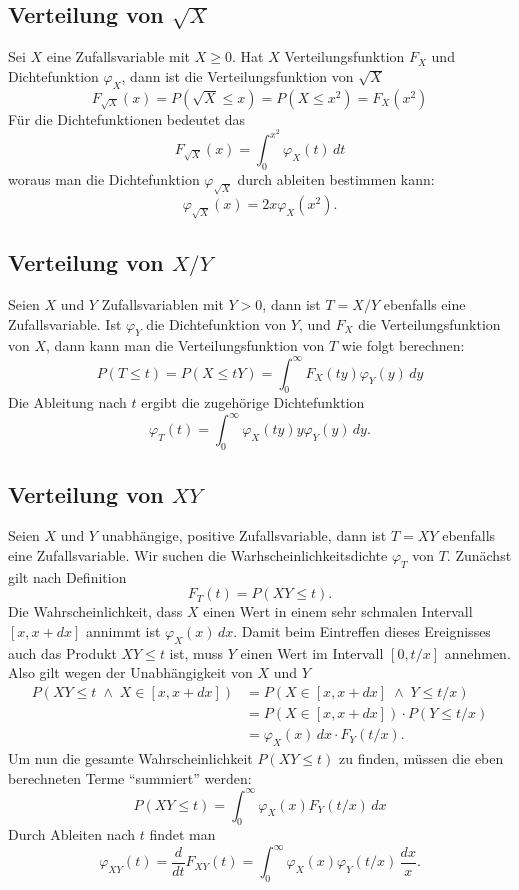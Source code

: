 \subsection{Verteilung von \texorpdfstring{$\sqrt{X}$}{Wurzel X}} \label{verteilungsfunktion-wurzel}
Sei $X$ eine Zufallsvariable mit $X\ge 0$.
Hat $X$ Verteilungsfunktion $F_X$
und Dichtefunktion
$\varphi_X$, dann ist die Verteilungsfunktion von $\sqrt{X}$
\[
F_{\sqrt{X}}(x)=P(\sqrt{X}\le x)=P(X\le x^2)=F_X(x^2)
\]
Für die Dichtefunktionen bedeutet das
\[
F_{\sqrt{X}}(x)=\int_0^{x^2}\varphi_X(t)\,dt
\]
woraus man die Dichtefunktion $\varphi_{\sqrt{X}}$ durch ableiten
bestimmen kann:
\[
\varphi_{\sqrt{X}}(x)=2x\varphi_X(x^2).
\]

\subsection{Verteilung von \texorpdfstring{$X/Y$}{X/Y}} \label{verteilungsfunktion-quotient}
Seien $X$ und $Y$ Zufallsvariablen mit $Y>0$, dann ist $T=X/Y$ ebenfalls
eine Zufallsvariable.
Ist $\varphi_Y$ die Dichtefunktion von $Y$,
und $F_X$ die Verteilungsfunktion von $X$, dann kann man die
Verteilungsfunktion von $T$ wie folgt berechnen:
\[
P(T\le t)=P(X\le tY)=\int_0^\infty F_X(ty)\varphi_Y(y)\,dy
\]
Die Ableitung nach $t$ ergibt die zugehörige Dichtefunktion
\[
\varphi_T(t)=\int_0^\infty\varphi_X(ty)y\varphi_Y(y)\,dy.
\]

\subsection{Verteilung von \texorpdfstring{$XY$}{XY}} \label{verteilungsfunktion-produkt}
Seien $X$ und $Y$ unabhängige, positive Zufallsvariable, dann ist $T=XY$
ebenfalls eine Zufallsvariable.
Wir suchen die Warhscheinlichkeitsdichte $\varphi_T$ von $T$.
Zunächst gilt nach Definition
\[
F_T(t)=P(XY\le t).
\]
Die Wahrscheinlichkeit, dass $X$ einen Wert in einem sehr schmalen Intervall
$[x,x+dx]$ annimmt ist $\varphi_X(x)\,dx$.
Damit beim Eintreffen dieses Ereignisses auch das Produkt
$XY\le t$ ist, muss $Y$ einen Wert im Intervall $[0,t/x]$ annehmen.
Also gilt wegen der Unabhängigkeit von $X$ und $Y$
\begin{align*}
P(XY\le t\;\wedge\; X\in[x,x+dx])&=P(X\in[x,x+dx]\;\wedge\; Y\le t/x)\\
&=P(X\in[x,x+dx])\cdot P(Y\le t/x)\\
&=\varphi_X(x)\,dx\cdot F_Y(t/x).
\end{align*}
Um nun die gesamte Wahrscheinlichkeit $P(XY\le t)$ zu finden, müssen die eben
berechneten Terme ``summiert'' werden:
\[
P(XY\le t)=\int_0^\infty\varphi_X(x)F_Y(t/x)\,dx
\]
Durch Ableiten nach $t$ findet man
\[
\varphi_{XY}(t)=\frac{d}{dt}F_{XY}(t)=\int_0^\infty \varphi_X(x)\varphi_Y(t/x)\,\frac{dx}x.
\]



